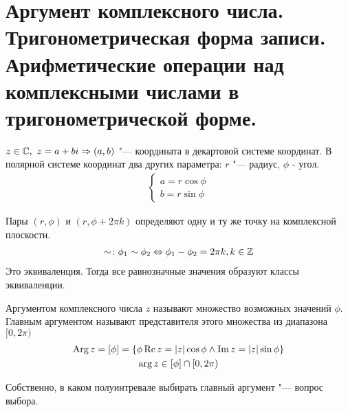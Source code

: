 \section{Аргумент комплексного числа. Тригонометрическая форма записи. Арифметические операции над комплексными числами в тригонометрической форме.}

\begin{center}
\def\svgwidth{6.0cm}

\end{center}
$z \in \mathbb{C},~z = a + bi \Rightarrow (a, b)$ "--- координата в декартовой системе координат. В полярной системе координат два других параметра: $r$ "--- радиус, $\phi$ - угол.
\begin{gather*}
\left\{
\begin{aligned}
	a = r\cos \phi  \\
	b = r\sin \phi
\end{aligned}\right.
\end{gather*}

Пары $(r, \phi)$ и $(r, \phi + 2 \pi k)$ определяют одну и ту же точку на комплексной плоскости.
\begin{gather*}
\sim\colon \phi_1 \sim \phi_2 \Leftrightarrow \phi_1 - \phi_2 = 2 \pi k, k\in \mathbb{Z}
\end{gather*}
Это эквиваленция. Тогда все равнозначные значения образуют классы эквиваленции.
\begin{Def}
Аргументом комплексного числа $z$ называют множество возможных значений $\phi$. Главным аргументом называют представителя этого множества из диапазона $[0,2\pi)$
\begin{gather*}
\operatorname{Arg} z = [\phi] = \left\{\phi \mathop{\mathrm{Re}}\nolimits z = |z| \cos \phi \land \mathop{\mathrm{Im}}\nolimits z = |z| \sin \phi\right\}\\
\arg z \in [\phi] \cap [0,2\pi)
\end{gather*}
\end{Def}
\begin{Rem}
Собственно, в каком полуинтревале выбирать главный аргумент "--- вопрос выбора.
\end{Rem}

